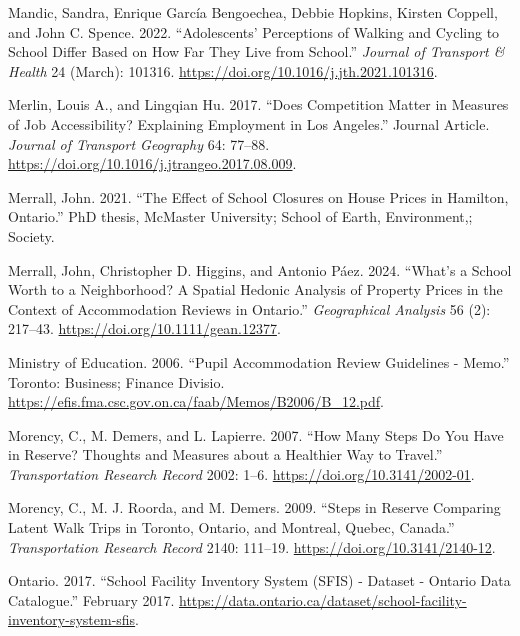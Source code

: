 \documentclass[
default
]{sn-jnl}
\newlength{\cslhangindent}
\newenvironment{CSLReferences}[2] %
 {\begin{list}{}{%
  \setlength{\itemindent}{0pt}
  \setlength{\leftmargin}{0pt}
  \setlength{\parsep}{0pt}
  \ifodd #1
   \setlength{\leftmargin}{\cslhangindent}
   \setlength{\itemindent}{-1\cslhangindent}
  \fi
  \setlength{\itemsep}{#2\baselineskip}}}
 {\end{list}}
\begin{document}
\begin{CSLReferences}{1}{0}
Mandic, Sandra, Enrique García Bengoechea, Debbie Hopkins, Kirsten
Coppell, and John C. Spence. 2022. {``Adolescents' Perceptions of
Walking and Cycling to School Differ Based on How Far They Live from
School.''} \emph{Journal of Transport \& Health} 24 (March): 101316.
\url{https://doi.org/10.1016/j.jth.2021.101316}.

Merlin, Louis A., and Lingqian Hu. 2017. {``Does Competition Matter in
Measures of Job Accessibility? Explaining Employment in Los Angeles.''}
Journal Article. \emph{Journal of Transport Geography} 64: 77--88.
\url{https://doi.org/10.1016/j.jtrangeo.2017.08.009}.

Merrall, John. 2021. {``The Effect of School Closures on House Prices in
Hamilton, Ontario.''} PhD thesis, McMaster University; School of Earth,
Environment,; Society.

Merrall, John, Christopher D. Higgins, and Antonio Páez. 2024. {``What's
a School Worth to a Neighborhood? {A} Spatial Hedonic Analysis of
Property Prices in the Context of Accommodation Reviews in Ontario.''}
\emph{Geographical Analysis} 56 (2): 217--43.
\url{https://doi.org/10.1111/gean.12377}.

Ministry of Education. 2006. {``Pupil Accommodation Review Guidelines -
Memo.''} Toronto: Business; Finance Divisio.
\url{https://efis.fma.csc.gov.on.ca/faab/Memos/B2006/B_12.pdf}.

Morency, C., M. Demers, and L. Lapierre. 2007. {``How Many Steps Do You
Have in Reserve? {Thoughts} and Measures about a Healthier Way to
Travel.''} \emph{Transportation Research Record} 2002: 1--6.
\url{https://doi.org/10.3141/2002-01}.

Morency, C., M. J. Roorda, and M. Demers. 2009. {``Steps in {Reserve
Comparing Latent Walk Trips} in {Toronto}, {Ontario}, and {Montreal},
{Quebec}, {Canada}.''} \emph{Transportation Research Record} 2140:
111--19. \url{https://doi.org/10.3141/2140-12}.

Ontario. 2017. {``School Facility Inventory System ({SFIS}) - Dataset -
Ontario Data Catalogue.''} February 2017.
\url{https://data.ontario.ca/dataset/school-facility-inventory-system-sfis}.


\end{CSLReferences}
\end{document}
